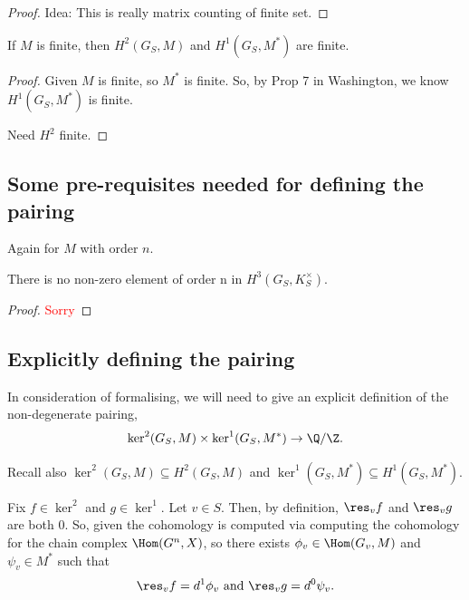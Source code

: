 \documentclass[11pt]{article}
\begin{document}
\begin{proof}
    Idea: This is really matrix counting of finite set.
\end{proof}

\begin{lem}
    If $M$ is finite, then $H^2(G_S, M)$ and $H^1 (G_S, M^*)$ are finite.
\end{lem}

\begin{proof}
    Given $M$ is finite, so $M^*$ is finite. So, by Prop 7 in Washington, we know $H^1 (G_S, M^*)$ is finite.

    \bigskip
    Need $H^2$ finite.
\end{proof}

\subsection{Some pre-requisites needed for defining the pairing}
Again for $M$ with order $n$.
\begin{lem} \label{lem:H3-n-torsion-trivial }
 There is no non-zero element of order n in $H^3 (G_S, K_S^\times)$.
\end{lem}

\begin{proof}
    \textcolor{red}{Sorry}
\end{proof}

\subsection{Explicitly defining the pairing}


In consideration of formalising, we will need to give an explicit definition of the non-degenerate pairing,
\[
\ker^2 (G_S, M) \times \ker^1 (G_S, M^*) \to \Q/\Z.
\]


\bigskip
Recall also $\ker^2 (G_S, M) \subseteq H^2 (G_S, M)$ and $\ker^1 (G_S, M^*) \subseteq H^1 (G_S, M^*)$.

\bigskip
Fix $f \in \ker^2$ and $g \in \ker^1$. Let $v \in S$. Then, by definition, $\res_v f$ and $\res_v g$ are both 0. So, given the cohomology is computed via computing the cohomology for the chain complex $\Hom (G^n, X)$, so there exists $\phi_v \in \Hom (G_v, M)$  and $\psi_v \in M^*$ such that
\[
\res_v f = d^1 \phi_v \text{ and } \res_v g = d^0 \psi_v.
\]
\end{document}
